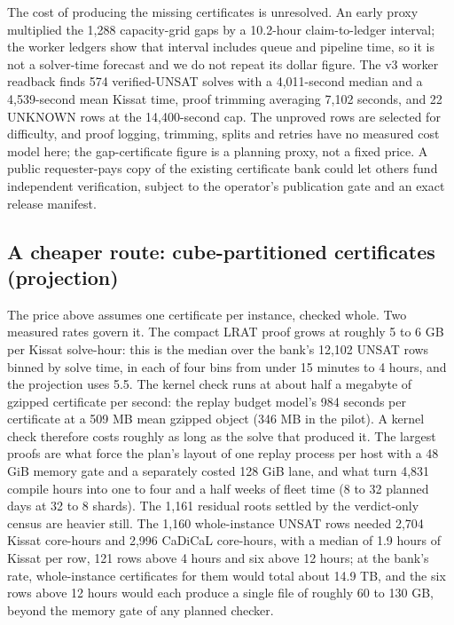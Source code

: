 \documentclass{anvil-paper}
\theoremstyle{definition}
\begin{document}
The cost of producing the missing certificates is unresolved. An early proxy multiplied the 1,288 capacity-grid gaps by a 10.2-hour claim-to-ledger interval; the worker ledgers show that interval includes queue and pipeline time, so it is not a solver-time forecast and we do not repeat its dollar figure. The v3 worker readback finds 574 verified-UNSAT solves with a 4,011-second median and a 4,539-second mean Kissat time, proof trimming averaging 7,102 seconds, and 22 UNKNOWN rows at the 14,400-second cap. The unproved rows are selected for difficulty, and proof logging, trimming, splits and retries have no measured cost model here; the gap-certificate figure is a planning proxy, not a fixed price. A public requester-pays copy of the existing certificate bank could let others fund independent verification, subject to the operator's publication gate and an exact release manifest.

\subsection{A cheaper route: cube-partitioned certificates (projection)}\label{sec:cube}

The price above assumes one certificate per instance, checked whole. Two measured rates govern it. The compact LRAT proof grows at roughly 5 to 6 GB per Kissat solve-hour: this is the median over the bank's 12,102 UNSAT rows binned by solve time, in each of four bins from under 15 minutes to 4 hours, and the projection uses 5.5. The kernel check runs at about half a megabyte of gzipped certificate per second: the replay budget model's 984 seconds per certificate at a 509 MB mean gzipped object (346 MB in the pilot). A kernel check therefore costs roughly as long as the solve that produced it. The largest proofs are what force the plan's layout of one replay process per host with a 48 GiB memory gate and a separately costed 128 GiB lane, and what turn 4,831 compile hours into one to four and a half weeks of fleet time (8 to 32 planned days at 32 to 8 shards). The 1,161 residual roots settled by the verdict-only census are heavier still. The 1,160 whole-instance UNSAT rows needed 2,704 Kissat core-hours and 2,996 CaDiCaL core-hours, with a median of 1.9 hours of Kissat per row, 121 rows above 4 hours and six above 12 hours; at the bank's rate, whole-instance certificates for them would total about 14.9 TB, and the six rows above 12 hours would each produce a single file of roughly 60 to 130 GB, beyond the memory gate of any planned checker.
\end{document}

